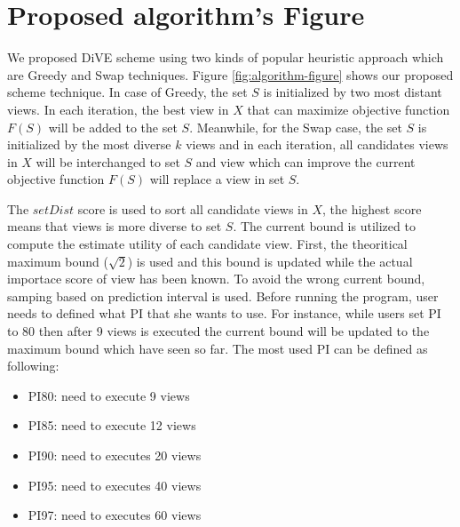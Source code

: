 \documentclass{article}
\begin{document}
\section{Proposed algorithm's Figure}
We proposed DiVE scheme using two kinds of popular heuristic approach which are Greedy and Swap techniques. Figure \ref{fig:algorithm-figure} shows our proposed scheme technique. In case of Greedy, the set $ S $ is initialized by two most distant views. In each iteration, the best view in $ X $ that can maximize objective function $F(S)$ will be added to the set $ S $. Meanwhile, for the Swap case, the set $ S $ is initialized by the most diverse $  k $ views and in each iteration, all candidates views in $ X $ will be interchanged to set $ S $ and view which can improve the current objective function $F(S)$ will replace a view in set $ S $.

The $setDist$ score is used to sort all candidate views in $ X $, the highest score means that views is more diverse to set $ S $. The current bound is utilized to compute the estimate utility of each candidate view. First, the theoritical maximum bound ($ \sqrt{2} $) is used and this bound is updated while the actual importace score of view has been known. To avoid the wrong current bound, samping based on prediction interval is used. Before running the program, user needs to defined what PI that she wants to use. For instance, while users set PI to 80 then after 9 views is executed the current bound will be updated to the maximum bound which have seen so far. The most used PI can be defined as following: 

\begin{itemize}[noitemsep]
	\item PI80: need to execute 9 views
	\item PI85: need to execute 12 views
	\item PI90: need to executes 20 views
	\item PI95: need to executes 40 views
	\item PI97: need to executes 60 views
\end{itemize}
\end{document}
